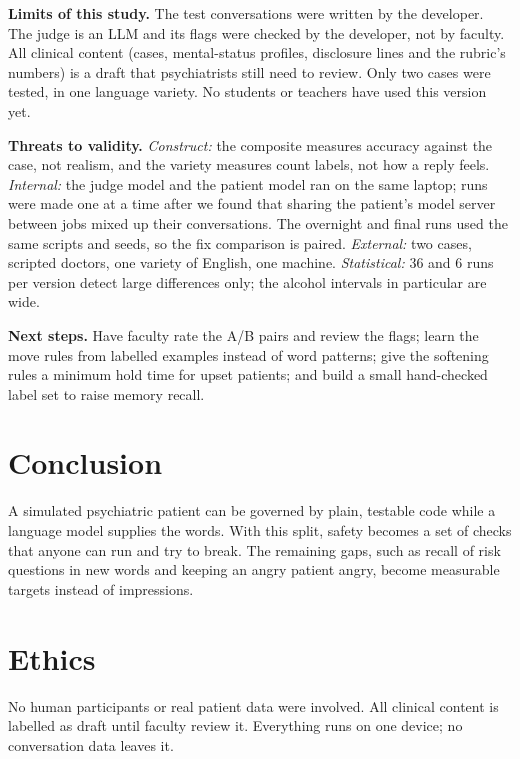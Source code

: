 \documentclass[twoside,11pt]{article}
\begin{document}
\textbf{Limits of this study.} The test conversations were written by the developer. The judge is an LLM and its flags were checked by the
developer, not by faculty. All clinical content (cases, mental-status profiles, disclosure lines and the rubric's numbers) is a draft that
psychiatrists still need to review. Only two cases were tested, in one language variety. No students or teachers have used this version yet.

\textbf{Threats to validity.} \emph{Construct:} the composite measures accuracy against the case, not realism, and the variety measures
count labels, not how a reply feels. \emph{Internal:} the judge model and the patient model ran on the same laptop; runs were made one at a
time after we found that sharing the patient's model server between jobs mixed up their conversations. The overnight and final runs used the
same scripts and seeds, so the fix comparison is paired. \emph{External:} two cases, scripted doctors, one variety of English, one machine.
\emph{Statistical:} 36 and 6 runs per version detect large differences only; the alcohol intervals in particular are wide.

\textbf{Next steps.} Have faculty rate the A/B pairs and review the flags; learn the move rules from labelled examples instead of word patterns;
give the softening rules a minimum hold time for upset patients; and build a small hand-checked label set to raise memory recall.

\section{Conclusion}
A simulated psychiatric patient can be governed by plain, testable code while a language model supplies the words. With this split, safety becomes a set of checks that anyone can run and try to break. The remaining gaps, such as recall of risk questions in new words and keeping an angry patient angry, become measurable targets instead of impressions.

\section*{Ethics}
No human participants or real patient data were involved. All clinical content is labelled as draft until faculty review it. Everything runs on
one device; no conversation data leaves it.
\end{document}
